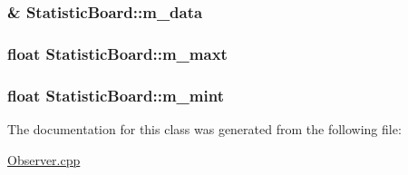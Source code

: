 \subsubsection[{\texorpdfstring{m\+\_\+data}{m_data}}]{\& Statistic\+Board\+::m\+\_\+data\hspace{0.3cm}{\ttfamily [private]}}\hypertarget{classStatisticBoard_a53d2b170ec3d9127fe13bd9d3cc751d7}{}\label{classStatisticBoard_a53d2b170ec3d9127fe13bd9d3cc751d7}
\subsubsection[{\texorpdfstring{m\+\_\+maxt}{m_maxt}}]{\setlength{\rightskip}{0pt plus 5cm}float Statistic\+Board\+::m\+\_\+maxt\hspace{0.3cm}{\ttfamily [private]}}\hypertarget{classStatisticBoard_ae44658877f1ef0413ab0212671de455a}{}\label{classStatisticBoard_ae44658877f1ef0413ab0212671de455a}
\subsubsection[{\texorpdfstring{m\+\_\+mint}{m_mint}}]{\setlength{\rightskip}{0pt plus 5cm}float Statistic\+Board\+::m\+\_\+mint\hspace{0.3cm}{\ttfamily [private]}}\hypertarget{classStatisticBoard_a7d8f109c876c413a035c356e19f59b6f}{}\label{classStatisticBoard_a7d8f109c876c413a035c356e19f59b6f}


The documentation for this class was generated from the following file\+:\begin{DoxyCompactItemize}
\item 
\hyperlink{Observer_8cpp}{Observer.\+cpp}\end{DoxyCompactItemize}
